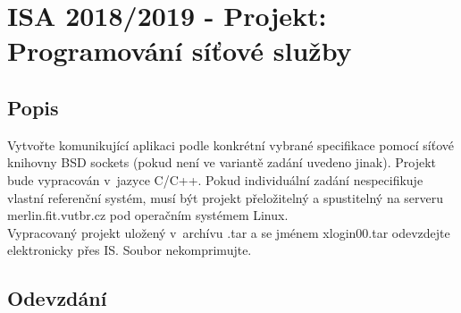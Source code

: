 \documentclass[11pt, a4paper, titlepage]{article}
\begin{document}
\section*{ISA 2018/2019 - Projekt: Programování síťové služby}
\bigskip


\subsection*{Popis}

Vytvořte komunikující aplikaci podle konkrétní vybrané specifikace pomocí síťové knihovny BSD sockets (pokud není ve variantě zadání uvedeno jinak). Projekt bude vypracován v~jazyce C/C++. Pokud individuální zadání nespecifikuje vlastní referenční systém, musí být projekt přeložitelný a spustitelný na serveru merlin.fit.vutbr.cz pod operačním systémem Linux.\\

Vypracovaný projekt uložený v~archívu .tar a se jménem xlogin00.tar odevzdejte elektronicky přes IS. Soubor nekomprimujte.


\subsection*{Odevzdání}
\end{document}
